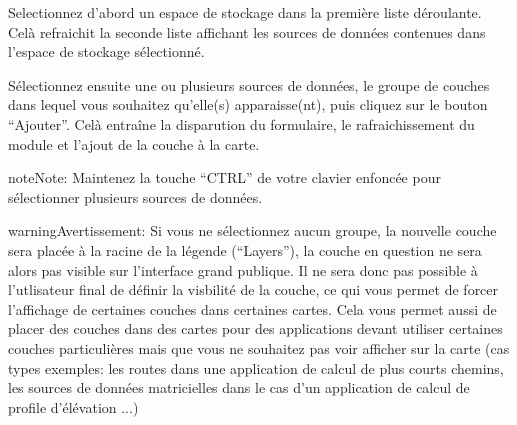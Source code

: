 \documentclass[letterpaper,10pt,french]{sphinxmanual}
\begin{document}
Selectionnez d'abord un espace de stockage dans la première liste
déroulante. Celà refraichit la seconde liste affichant les sources de
données contenues dans l'espace de stockage sélectionné.

Sélectionnez ensuite une ou plusieurs sources de données, le groupe de
couches dans lequel vous souhaitez qu'elle(s) apparaisse(nt), puis
cliquez sur le bouton ``Ajouter''. Celà entraîne la disparution du
formulaire, le rafraichissement du module et l'ajout de la couche à
la carte.


\begin{notice}{note}{Note:}
Maintenez la touche ``CTRL'' de votre clavier enfoncée pour
sélectionner plusieurs sources de données.
\end{notice}

\begin{notice}{warning}{Avertissement:}
Si vous ne sélectionnez aucun groupe, la nouvelle couche sera
placée à la racine de la légende (``Layers''), la couche en question
ne sera alors pas visible sur l'interface grand publique. Il ne
sera donc pas possible à l'utlisateur final de définir la visbilité
de la couche, ce qui vous permet de forcer l'affichage de certaines
couches dans certaines cartes. Cela vous permet aussi de placer des
couches dans des cartes pour des applications devant utiliser
certaines couches particulières mais que vous ne souhaitez pas voir
afficher sur la carte (cas types exemples: les routes dans une
application de calcul de plus courts chemins, les sources de
données matricielles dans le cas d'un application de calcul de
profile d'élévation ...)
\end{notice}
\end{document}

